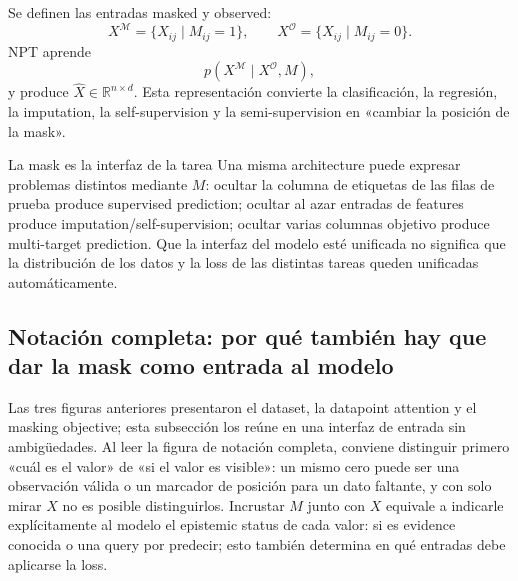 
Se definen las entradas masked y observed:
\[
X^{\mathcal{M}}=\{X_{ij}\mid M_{ij}=1\},\qquad
X^{\mathcal{O}}=\{X_{ij}\mid M_{ij}=0\}.
\]
NPT aprende
\[
p\!\left(X^{\mathcal{M}}\mid X^{\mathcal{O}},M\right),
\]
y produce $\widehat X\in\mathbb{R}^{n\times d}$. Esta representación convierte la clasificación, la regresión, la imputation, la self-supervision y la semi-supervision en «cambiar la posición de la mask».

\begin{importantbox}{La mask es la interfaz de la tarea}
Una misma architecture puede expresar problemas distintos mediante $M$: ocultar la columna de etiquetas de las filas de prueba produce supervised prediction; ocultar al azar entradas de features produce imputation/self-supervision; ocultar varias columnas objetivo produce multi-target prediction. Que la interfaz del modelo esté unificada no significa que la distribución de los datos y la loss de las distintas tareas queden unificadas automáticamente.
\end{importantbox}

\subsection{Notación completa: por qué también hay que dar la mask como entrada al modelo}

Las tres figuras anteriores presentaron el dataset, la datapoint attention y el masking objective; esta subsección los reúne en una interfaz de entrada sin ambigüedades. Al leer la figura de notación completa, conviene distinguir primero «cuál es el valor» de «si el valor es visible»: un mismo cero puede ser una observación válida o un marcador de posición para un dato faltante, y con solo mirar $X$ no es posible distinguirlos. Incrustar $M$ junto con $X$ equivale a indicarle explícitamente al modelo el epistemic status de cada valor: si es evidence conocida o una query por predecir; esto también determina en qué entradas debe aplicarse la loss.


